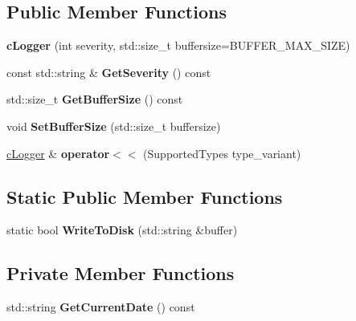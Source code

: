 \subsection*{\-Public \-Member \-Functions}
\begin{DoxyCompactItemize}
\item 
\hypertarget{classengine_1_1cLogger_a4d2e48a2b56fff56c4bb99b11721b9ae}{
{\bfseries c\-Logger} (int severity, std\-::size\-\_\-t buffersize=\-B\-U\-F\-F\-E\-R\-\_\-\-M\-A\-X\-\_\-\-S\-I\-Z\-E)}
\label{classengine_1_1cLogger_a4d2e48a2b56fff56c4bb99b11721b9ae}

\item 
\hypertarget{classengine_1_1cLogger_a1473c1a79b0e677476da12f457fd8ff6}{
const std\-::string \& {\bfseries \-Get\-Severity} () const }
\label{classengine_1_1cLogger_a1473c1a79b0e677476da12f457fd8ff6}

\item 
\hypertarget{classengine_1_1cLogger_acc4b204596d129daa041d8e91a4428ae}{
std\-::size\-\_\-t {\bfseries \-Get\-Buffer\-Size} () const }
\label{classengine_1_1cLogger_acc4b204596d129daa041d8e91a4428ae}

\item 
\hypertarget{classengine_1_1cLogger_af0af36942fb9088fc36b9d5c32b06247}{
void {\bfseries \-Set\-Buffer\-Size} (std\-::size\-\_\-t buffersize)}
\label{classengine_1_1cLogger_af0af36942fb9088fc36b9d5c32b06247}

\item 
\hypertarget{classengine_1_1cLogger_afaad3dca17bb3dd399d379e2ddd114b2}{
\hyperlink{classengine_1_1cLogger}{c\-Logger} \& {\bfseries operator$<$$<$} (\-Supported\-Types type\-\_\-variant)}
\label{classengine_1_1cLogger_afaad3dca17bb3dd399d379e2ddd114b2}

\end{DoxyCompactItemize}
\subsection*{\-Static \-Public \-Member \-Functions}
\begin{DoxyCompactItemize}
\item 
\hypertarget{classengine_1_1cLogger_a2ed9b730459e799531f3b56a2ec02306}{
static bool {\bfseries \-Write\-To\-Disk} (std\-::string \&buffer)}
\label{classengine_1_1cLogger_a2ed9b730459e799531f3b56a2ec02306}

\end{DoxyCompactItemize}
\subsection*{\-Private \-Member \-Functions}
\begin{DoxyCompactItemize}
\item 
\hypertarget{classengine_1_1cLogger_a62d0c265a5fc3b81f8d31868edc34834}{
std\-::string {\bfseries \-Get\-Current\-Date} () const }
\label{classengine_1_1cLogger_a62d0c265a5fc3b81f8d31868edc34834}

\end{DoxyCompactItemize}
